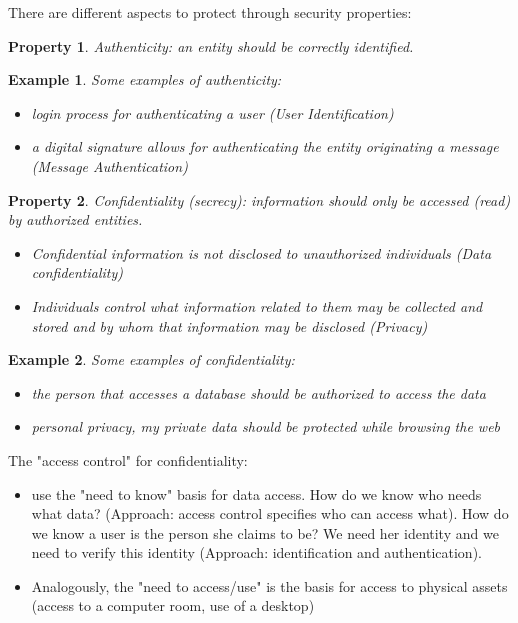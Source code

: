 \documentclass[a4paper, 12pt]{report}
\newtheorem{property}{\textbf{Property}}
\newtheorem{example}{\textbf{Example}}
\begin{document}
\vspace{5mm}
There are different aspects to protect through security properties:
\begin{property}
	Authenticity: an entity should be correctly identified.
\end{property}
\begin{example}
	Some examples of authenticity:
	\begin{itemize}
		\item login process for authenticating a user (User Identification)
		\item a digital signature allows for authenticating the entity originating a message (Message Authentication)
	\end{itemize}
\end{example}
\vspace{5mm}
\begin{property}
	Confidentiality (secrecy): information should only be accessed (read) by authorized entities.
	\begin{itemize}
		\item Confidential information is not disclosed to unauthorized individuals (Data confidentiality)
		\item Individuals control what information related to them may be collected and stored and by whom that information may be disclosed (Privacy)
	\end{itemize}
\end{property}
\begin{example}
	Some examples of confidentiality:
	\begin{itemize}
		\item the person that accesses a database should be authorized to access the data
		\item personal privacy, my private data should be protected while browsing the web
	\end{itemize}
\end{example}
The "access control" for confidentiality:
\begin{itemize}
	\item use the "need to know" basis for data access. How do we know who needs what data? (Approach: access control specifies who can access what). How do we know a user is the person she claims to be? We need her identity and we need to verify this identity (Approach: identification and authentication).
	\item Analogously, the "need to access/use" is the basis for access to physical assets (access to a computer room, use of a desktop)
\end{itemize}
\end{document}
